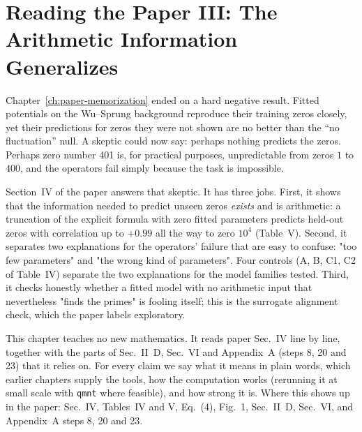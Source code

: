 \chapter{Reading the Paper III: The Arithmetic Information Generalizes}\label{ch:paper-arithmetic}

\begin{chapterintro}
Chapter~\ref{ch:paper-memorization} ended on a hard negative result. Fitted potentials on the Wu--Sprung background reproduce their training zeros closely, yet their predictions for zeros they were not shown are no better than the ``no fluctuation'' null. A skeptic could now say: perhaps nothing predicts the zeros. Perhaps zero number 401 is, for practical purposes, unpredictable from zeros $1$ to $400$, and the operators fail simply because the task is impossible.

Section~IV of the paper answers that skeptic. It has three jobs. First, it shows that the information needed to predict unseen zeros \emph{exists} and is arithmetic: a truncation of the explicit formula with zero fitted parameters predicts held-out zeros with correlation up to $+0.99$ all the way to zero $10^4$ (Table~V). Second, it separates two explanations for the operators' failure that are easy to confuse: "too few parameters" and "the wrong kind of parameters". Four controls (A, B, C1, C2 of Table~IV) separate the two explanations for the model families tested. Third, it checks honestly whether a fitted model with no arithmetic input that nevertheless "finds the primes" is fooling itself; this is the surrogate alignment check, which the paper labels exploratory.

This chapter teaches no new mathematics. It reads paper Sec.~IV line by line, together with the parts of Sec.~II~D, Sec.~VI and Appendix~A (steps 8, 20 and 23) that it relies on. For every claim we say what it means in plain words, which earlier chapters supply the tools, how the computation works (rerunning it at small scale with \texttt{qmnt} where feasible), and how strong it is. Where this shows up in the paper: Sec.~IV, Tables~IV and V, Eq.~(4), Fig.~1, Sec.~II~D, Sec.~VI, and Appendix~A steps 8, 20 and 23.
\end{chapterintro}

